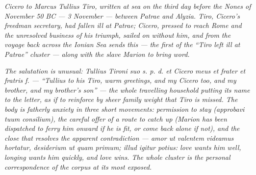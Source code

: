 
\textit{Cicero to Marcus Tullius Tiro, written at sea on
the third day before the Nones of November 50 BC ---
3 November --- between Patrae and Alyzia. Tiro,
Cicero's freedman secretary, had fallen ill at Patrae;
Cicero, pressed to reach Rome and the unresolved business
of his triumph, sailed on without him, and from the
voyage back across the Ionian Sea sends this --- the
first of the ``Tiro left ill at Patrae'' cluster ---
along with the slave Marion to bring word.}

\textit{The salutation is unusual: \textit{Tullius Tironi
suo s. p. d. et Cicero meus et frater et fratris f.} ---
``Tullius to his Tiro, warm greetings, and my Cicero too,
and my brother, and my brother's son'' --- the whole
travelling household putting its name to the letter, as if
to reinforce by sheer family weight that Tiro is missed.
The body is fatherly anxiety in three short movements:
permission to stay (\textit{approbavi tuum consilium}),
the careful offer of a route to catch up (Marion has been
dispatched to ferry him onward if he is fit, or come back
alone if not), and the close that resolves the apparent
contradiction --- \textit{amor ut valentem videamus
hortatur, desiderium ut quam primum; illud igitur
potius}: love wants him well, longing wants him quickly,
and love wins. The whole cluster is the personal
correspondence of the corpus at its most exposed.}
